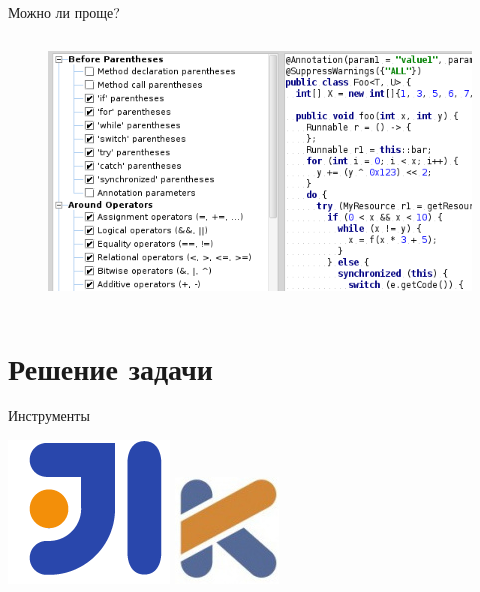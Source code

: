 \documentclass[sans]{beamer}
\begin{document}
\begin{frame}{Можно ли проще?}
\begin{columns}
		\begin{column}{.4\textwidth}
			\begin{figure}
				\includegraphics[width = \linewidth]{images/snapshot1.png}
			\end{figure}
		\end{column}
	\end{columns}
\end{frame}

\section{Решение задачи}

\begin{frame}{Инструменты}
	\begin{center}
		\includegraphics[width = 0.3\linewidth]{images/idea-logo.png}
		\hspace{3cm}
		\includegraphics[width = 0.3\linewidth]{images/kotlin-logo.jpg}
	\end{center}
\end{frame}
\end{document}
